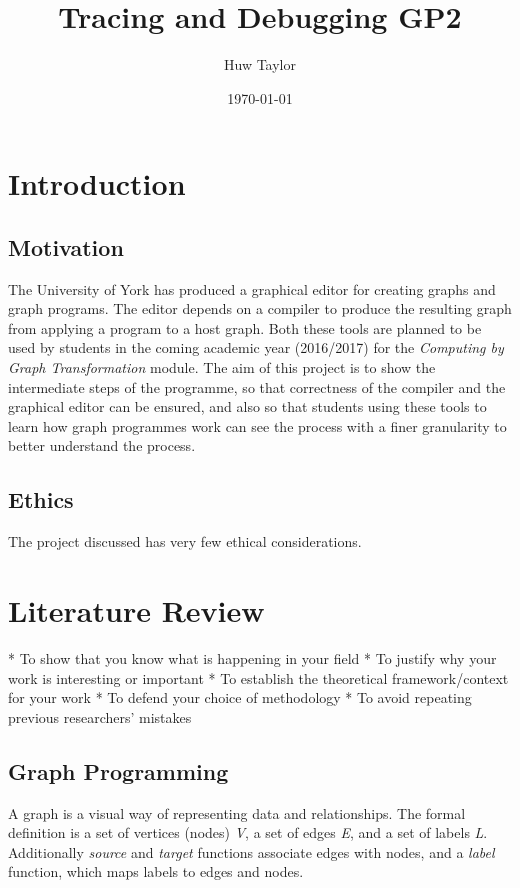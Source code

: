 \documentclass{UoYCSproject}
\author{Huw Taylor}
\title{Tracing and Debugging GP2}
\date{\today}
\begin{document}
\maketitle
\tableofcontents
\listoffigures

\chapter{Introduction}
\section{Motivation}
The University of York has produced a graphical editor for creating graphs and graph programs. The editor depends on a compiler to produce the resulting graph from applying a program to a host graph. Both these tools are planned to be used by students in the coming academic year (2016/2017) for the \emph{Computing by Graph Transformation} module.
The aim of this project is to show the intermediate steps of the programme, so that correctness of the compiler and the graphical editor can be ensured, and also so that students using these tools to learn how graph programmes work can see the process with a finer granularity to better understand the process.
\section{Ethics}
The project discussed has very few ethical considerations.

\chapter{Literature Review}


 * To show that you know what is happening in your field 
 * To justify why your work is interesting or important 
 * To establish the theoretical framework/context for your work 
 * To defend your choice of methodology 
 * To avoid repeating previous researchers’ mistakes
\section{Graph Programming}
A graph is a visual way of representing data and relationships. The formal definition is a set of vertices (nodes) \emph{V}, a set of edges \emph{E}, and a set of labels \emph{L}. Additionally \emph{source} and \emph{target} functions associate edges with nodes, and a \emph{label} function, which maps labels to edges and nodes.
\end{document}
